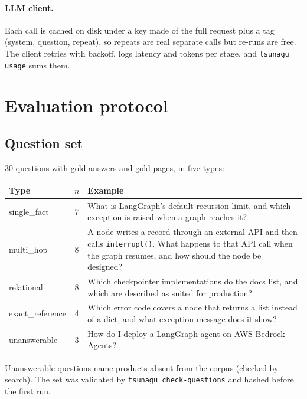 \documentclass[11pt,a4paper]{article}
\newcommand{\code}[1]{\texttt{#1}}
\begin{document}
\paragraph{LLM client.} Each call is cached on disk under a key made of the full request plus a
tag (system, question, repeat), so repeats are real separate calls but re-runs are free. The
client retries with backoff, logs latency and tokens per stage, and \code{tsunagu usage} sums
them.

\section{Evaluation protocol}

\subsection{Question set}

30 questions with gold answers and gold pages, in five types:

\begin{center}
\small
\begin{tabular}{lcp{9.5cm}}
\toprule
Type & $n$ & Example \\
\midrule
single\_fact & 7 & What is LangGraph's default recursion limit, and which exception is raised when a graph reaches it? \\
multi\_hop & 8 & A node writes a record through an external API and then calls \code{interrupt()}. What happens to that API call when the graph resumes, and how should the node be designed? \\
relational & 8 & Which checkpointer implementations do the docs list, and which are described as suited for production? \\
exact\_reference & 4 & Which error code covers a node that returns a list instead of a dict, and what exception message does it show? \\
unanswerable & 3 & How do I deploy a LangGraph agent on AWS Bedrock Agents? \\
\bottomrule
\end{tabular}
\end{center}

Unanswerable questions name products absent from the corpus (checked by search). The set was
validated by \code{tsunagu check-questions} and hashed before the first run.
\end{document}
